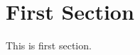 \documentclass{article}
\begin{document}
\tableofcontents

\section{First Section}

This is first section.

\printglossary
\end{document}
